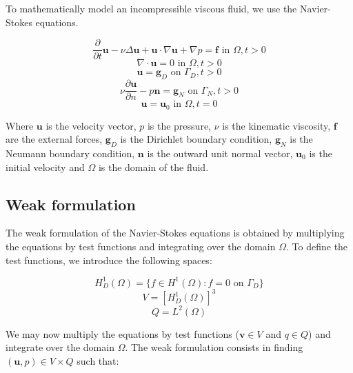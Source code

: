 To mathematically model an incompressible viscous fluid, we use the Navier-Stokes equations.

\begin{equation}
\frac{\partial}{\partial t} \mathbf{u} - \nu \Delta \mathbf{u} + \mathbf{u} \cdot \nabla \mathbf{u} + \nabla p = \mathbf{f} \text{ in } \Omega, t > 0 
\end{equation}
\begin{equation}
\nabla \cdot \mathbf{u} = 0 \text{ in } \Omega, t > 0
\end{equation}
\begin{equation}
\mathbf{u} = \mathbf{g}_D \text{ on } \Gamma_D, t > 0
\end{equation}
\begin{equation}
\nu \frac{\partial \mathbf{u}}{\partial n} - p \mathbf{n} = \mathbf{g}_N \text{ on } \Gamma_N, t > 0
\end{equation}
\begin{equation}
\mathbf{u} = \mathbf{u}_0 \text{ in } \Omega, t = 0
\end{equation}

Where $\mathbf{u}$ is the velocity vector, $p$ is the pressure, $\nu$ is the kinematic viscosity, $\mathbf{f}$ are the external forces, $\mathbf{g}_D$ is the Dirichlet boundary condition, $\mathbf{g}_N$ is the Neumann boundary condition, $\mathbf{n}$ is the outward unit normal vector, $\mathbf{u}_0$ is the initial velocity and $\Omega$ is the domain of the fluid.

\subsection{Weak formulation}
The weak formulation of the Navier-Stokes equations is obtained by multiplying the equations by test functions and integrating over the domain $\Omega$.
To define the test functions, we introduce the following spaces:

\begin{equation}
    H^1_D(\Omega) = \{f \in H^1(\Omega) : f = 0 \text{ on } \Gamma_D\}
\end{equation}
\begin{equation}
    V = [H^1_D(\Omega)]^3
\end{equation}
\begin{equation}
    Q = L^2(\Omega)
\end{equation}

We may now multiply the equations by test functions ($\mathbf{v} \in V$ and $q \in Q$) and integrate over the domain $\Omega$. The weak formulation consists in finding $(\mathbf{u}, p) \in V \times Q$ such that:

